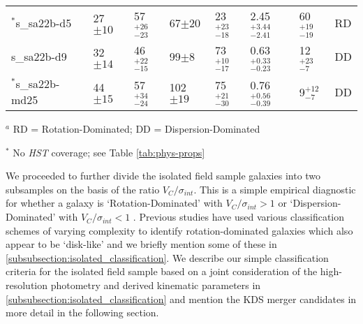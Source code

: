 \documentclass[fleqn,usenatbib]{mnras}
\begin{document}
\begin{table*}
\begin{threeparttable}
\begin{tabular}{llllllll}
$^{*}$s\_sa22b-d5     & 27$\pm10$                    & 57$^{+26}_{-23}$                     & 67$\pm20$                  & 23$^{+23}_{-18}$          & 2.45$^{+3.44}_{-2.41}$               & 60$^{+19}_{-19}$ & RD   \\[1ex]
s\_sa22b-d9     & 32$\pm14$                    & 46$^{+22}_{-15}$                     & 99$\pm8$                  & 73$^{+10}_{-17}$             & 0.63$^{+0.33}_{-0.23}$                 & 12$^{+23}_{-7}$ & DD   \\[1ex]
$^{*}$s\_sa22b-md25   & 44$\pm15$           & 57$^{+34}_{-24}$                     & 102$\pm19$   & 75$^{+21}_{-30}$                   & 0.76$^{+0.56}_{-0.39}$                & 9$^{+12}_{-7}$ & DD

\end{tabular}
\begin{tablenotes}
      \small
      \item $^{a}$ RD = Rotation-Dominated; DD = Dispersion-Dominated
      \item $^{*}$ No {\em HST} coverage; see Table \ref{tab:phys-props}
    \end{tablenotes}
  \end{threeparttable}
  \end{table*}

We proceeded to further divide the isolated field sample galaxies into two subsamples on the basis of the ratio $V_{C}/\sigma_{int}$.
This is a simple empirical diagnostic for whether a galaxy is `Rotation-Dominated' with $V_{C}/\sigma_{int} > 1$ or `Dispersion-Dominated' with $V_{C}/\sigma_{int} < 1$  \citep[i.e. a method to measure the prevalence of rotational and random motions;][]{Epinat2012,Wisnioski2015,Stott2016,Harrison2017}.
Previous studies have used various classification schemes of varying complexity to identify rotation-dominated galaxies which also appear to be `disk-like' and we briefly mention some of these in \cref{subsubsection:isolated_classification}.
We describe our simple classification criteria for the isolated field sample based on a joint consideration of the high-resolution photometry and derived kinematic parameters in \cref{subsubsection:isolated_classification} and mention the KDS merger candidates in more detail in the following section.
\end{document}
